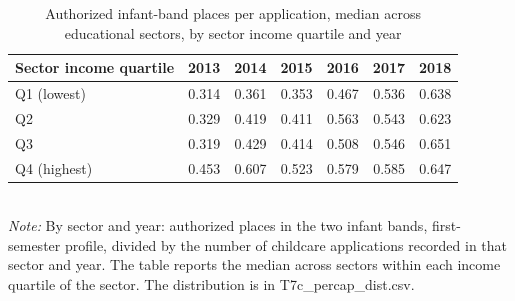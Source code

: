 \begin{table}[htbp]\centering
\caption{Authorized infant-band places per application, median across educational sectors, by sector income quartile and year}
\label{tab:T7c_percap}
\small
\setlength{\tabcolsep}{4pt}
\begin{tabular}{lrrrrrr}
\toprule
Sector income quartile & 2013 & 2014 & 2015 & 2016 & 2017 & 2018 \\
\midrule
Q1 (lowest) & 0.314 & 0.361 & 0.353 & 0.467 & 0.536 & 0.638 \\
Q2 & 0.329 & 0.419 & 0.411 & 0.563 & 0.543 & 0.623 \\
Q3 & 0.319 & 0.429 & 0.414 & 0.508 & 0.546 & 0.651 \\
Q4 (highest) & 0.453 & 0.607 & 0.523 & 0.579 & 0.585 & 0.647 \\
\bottomrule
\end{tabular}
\\[3pt]{\footnotesize \textit{Note:} By sector and year: authorized places in the two infant bands, first-semester profile, divided by the number of childcare applications recorded in that sector and year. The table reports the median across sectors within each income quartile of the sector. The distribution is in T7c\_percap\_dist.csv.}
\end{table}
